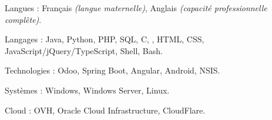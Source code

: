 \begin{indentsection}{\parindent}
  \begin{description*}
    \item[Langues :]
    Français \emph{(langue maternelle)}, %
    Anglais \emph{(capacité professionnelle complète)}. %
    \item[Langages :] Java, Python, PHP, SQL, C, \Csharp, HTML,
    CSS, JavaScript/jQuery/TypeScript, Shell, Bash.
    \item[Technologies :] Odoo, Spring Boot, Angular, Android, NSIS.
    \item[Systèmes :] Windows, Windows Server, Linux.
    \item[Cloud :] OVH, Oracle Cloud Infrastructure, CloudFlare.
  \end{description*}
\end{indentsection}
